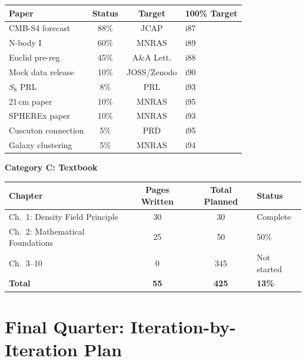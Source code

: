 \documentclass[11pt,a4paper]{article}
\begin{document}
\begin{tcolorbox}[colback=blue!5!white, colframe=dfdblue, title=\textbf{Paper Portfolio: 3/4 Mark}]
\begin{center}
\begin{tabular}{lccl}
\toprule
\textbf{Paper} & \textbf{Status} & \textbf{Target} & \textbf{100\% Target} \\
\midrule
CMB-S4 forecast & 88\% & JCAP & i87 \\
N-body I & 60\% & MNRAS & i89 \\
Euclid pre-reg & 45\% & A\&A Lett. & i88 \\
Mock data release & 10\% & JOSS/Zenodo & i90 \\
$S_8$ PRL & 8\% & PRL & i93 \\
21\,cm paper & 10\% & MNRAS & i95 \\
SPHEREx paper & 10\% & MNRAS & i93 \\
Cuscuton connection & 5\% & PRD & i95 \\
Galaxy clustering & 5\% & MNRAS & i94 \\
\bottomrule
\end{tabular}
\end{center}

\textbf{Category C: Textbook}

\begin{center}
\begin{tabular}{lccl}
\toprule
\textbf{Chapter} & \textbf{Pages Written} & \textbf{Total Planned} & \textbf{Status} \\
\midrule
Ch.\ 1: Density Field Principle & 30 & 30 & Complete \\
Ch.\ 2: Mathematical Foundations & 25 & 50 & 50\% \\
Ch.\ 3--10 & 0 & 345 & Not started \\
\midrule
\textbf{Total} & \textbf{55} & \textbf{425} & \textbf{13\%} \\
\bottomrule
\end{tabular}
\end{center}
\end{tcolorbox}

\section{Final Quarter: Iteration-by-Iteration Plan}
\end{document}
